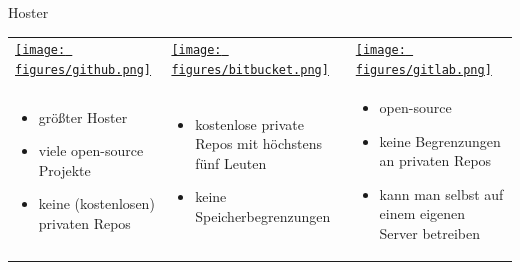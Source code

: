 \begin{frame}{Hoster}
  \begin{tabu}{@{} X[,C] @{} X[,C] @{} X[,C] @{}}
    \href{https://github.com}{\texttt{[image: figures/github.png]}} &
    \href{https://bitbucket.org}{\texttt{[image: figures/bitbucket.png]}} &
    \href{https://gitlab.com}{\texttt{[image: figures/gitlab.png]}} \\
    \begin{itemize}
      \item größter Hoster
      \item viele open-source Projekte
      \item keine (kostenlosen) privaten Repos
    \end{itemize}
    &
    \begin{itemize}
      \item kostenlose private Repos mit höchstens fünf Leuten
      \item keine Speicherbegrenzungen
    \end{itemize}
    &
    \begin{itemize}
      \item open-source
      \item keine Begrenzungen an privaten Repos
      \item kann man selbst auf einem eigenen Server betreiben
    \end{itemize}
  \end{tabu}
\end{frame}

